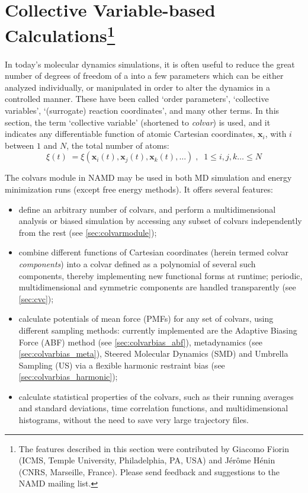 
\section{Collective Variable-based Calculations\footnote{ The features
described in this section were contributed by Giacomo Fiorin (ICMS,
Temple University, Philadelphia, PA, USA) and J\'er\^ome H\'enin (CNRS,
Marseille, France). Please send feedback and suggestions
to the NAMD mailing list.}}
\label{section:colvars}

In today's molecular dynamics simulations, it is often useful to
reduce the great number of degrees of freedom of a into a few
parameters which can be either analyzed individually, or manipulated
in order to alter the dynamics in a controlled manner.  These have
been called `order parameters', `collective variables', `(surrogate)
reaction coordinates', and many other terms.  In this section, the
term `collective variable' (shortened to \textit{colvar}) is used, and
it indicates any differentiable function of atomic Cartesian
coordinates, $\bm{x}_{i}$, with $i$ between $1$ and $N$, the total
number of atoms:
\begin{equation} 
  \label{eq:colvar_basic}
  \xi(t) \; = \xi\left(\bm{x}_{i}(t), \bm{x}_{j}(t), \bm{x}_{k}(t),
  \ldots \right)\;, \;\; 1 \leq i,j,k\ldots \leq N
\end{equation}

The colvars module in NAMD may be used in both MD simulation and
energy minimization runs (except free energy methods).
It offers several features:
\begin{itemize}

\item define an arbitrary number of colvars, and perform a
  multidimensional analysis or biased simulation by accessing any
  subset of colvars independently from the rest (see
  \ref{sec:colvarmodule});

\item combine different functions of Cartesian coordinates (herein
  termed colvar \emph{components}) into a colvar defined as a
  polynomial of several such components, thereby implementing new
  functional forms at runtime; periodic, multidimensional and
  symmetric components are handled transparently (see \ref{sec:cvc});

\item calculate potentials of mean force (PMFs) for any set of
  colvars, using different sampling methods: currently implemented are
  the Adaptive Biasing Force (ABF) method (see
  \ref{sec:colvarbias_abf}), metadynamics (see
  \ref{sec:colvarbias_meta}), Steered Molecular Dynamics (SMD) and
  Umbrella Sampling (US) via a flexible harmonic restraint bias (see
  \ref{sec:colvarbias_harmonic});

\item calculate statistical properties of the colvars, such as their
  running averages and standard deviations, time correlation
  functions, and multidimensional histograms, without the need to save
  very large trajectory files.

\end{itemize}


